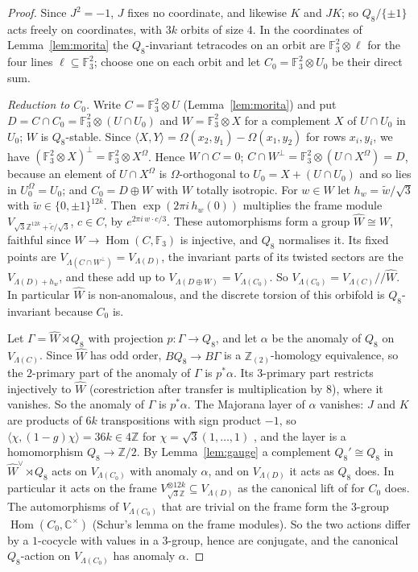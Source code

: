 \documentclass[11pt]{amsart}
\theoremstyle{definition}
\newcommand{\F}{\mathbb{F}_3}
\begin{document}
\begin{proof}
Since $J^2=-1$, $J$ fixes no coordinate, and likewise $K$ and $JK$; so $Q_8/\{\pm1\}$ acts freely
on coordinates, with $3k$ orbits of size $4$. In the coordinates of Lemma~\ref{lem:morita} the
$Q_8$-invariant tetracodes on an orbit are $\F^2\otimes\ell$ for the four lines $\ell\subseteq\F^2$; choose one
on each orbit and let $C_0=\F^2\otimes U_0$ be their direct sum.

\emph{Reduction to $C_0$.} Write $C=\F^2\otimes U$ (Lemma~\ref{lem:morita}) and put
$D=C\cap C_0=\F^2\otimes(U\cap U_0)$ and $W=\F^2\otimes X$ for a complement $X$ of $U\cap U_0$ in $U_0$;
$W$ is $Q_8$-stable. Since $\langle X,Y\rangle=\Omega(x_2,y_1)-\Omega(x_1,y_2)$ for rows $x_i,y_i$, we have
$(\F^2\otimes X)^\perp=\F^2\otimes X^\Omega$. Hence $W\cap C=0$; $C\cap W^\perp=\F^2\otimes(U\cap X^\Omega)=D$,
because an element of $U\cap X^\Omega$ is $\Omega$-orthogonal to $U_0=X+(U\cap U_0)$ and so lies in
$U_0^\Omega=U_0$; and $C_0=D\oplus W$ with $W$ totally isotropic. For $w\in W$ let $h_w=\tilde w/\sqrt3$ with
$\tilde w\in\{0,\pm1\}^{12k}$. Then $\exp(2\pi i\,h_w(0))$ multiplies the frame module
$V_{\sqrt3\mathbb Z^{12k}+\tilde c/\sqrt3}$, $c\in C$, by $e^{2\pi i\,w\cdot c/3}$. These automorphisms form a
group $\hat W\cong W$, faithful since $W\to\operatorname{Hom}(C,\F)$ is injective, and $Q_8$ normalises it.
Its fixed points are $V_{\Lambda(C\cap W^\perp)}=V_{\Lambda(D)}$, the invariant parts of its twisted sectors are
the $V_{\Lambda(D)+h_w}$, and these add up to $V_{\Lambda(D\oplus W)}=V_{\Lambda(C_0)}$. So
$V_{\Lambda(C_0)}=V_{\Lambda(C)}/\!\!/\hat W$. In particular $\hat W$ is non-anomalous, and the discrete torsion
of this orbifold is $Q_8$-invariant because $C_0$ is.

Let $\Gamma=\hat W\rtimes Q_8$ with projection $p\colon\Gamma\to Q_8$, and let $\alpha$ be the anomaly of $Q_8$ on
$V_{\Lambda(C)}$. Since $\hat W$ has
odd order, $BQ_8\to B\Gamma$ is a $\mathbb Z_{(2)}$-homology equivalence, so the $2$-primary part of the anomaly
of $\Gamma$ is $p^*\alpha$. Its $3$-primary part restricts injectively to $\hat W$ (corestriction after transfer
is multiplication by $8$), where it vanishes. So the anomaly of $\Gamma$ is $p^*\alpha$. The Majorana layer of
$\alpha$ vanishes: $J$ and $K$ are products of $6k$ transpositions with sign product $-1$, so
$\langle\chi,(1-g)\chi\rangle=36k\in4\mathbb Z$ for $\chi=\sqrt3(1,\dots,1)$ \cite[Ex.~4.4]{GJF}, and the layer is
a homomorphism $Q_8\to\mathbb Z/2$. By Lemma~\ref{lem:gauge} a complement $Q_8'\cong Q_8$ in
$\hat W^\vee\rtimes Q_8$ acts on $V_{\Lambda(C_0)}$ with anomaly $\alpha$, and on $V_{\Lambda(D)}$ it acts as $Q_8$
does. In particular it acts on the frame $V_{\sqrt3\mathbb Z}^{\otimes 12k}\subseteq V_{\Lambda(D)}$ as the
canonical lift of \cite[Thm.~3.1]{GJF} for $C_0$ does. The automorphisms of $V_{\Lambda(C_0)}$ that are trivial
on the frame form the $3$-group $\operatorname{Hom}(C_0,\mathbb C^\times)$ (Schur's lemma on the frame modules).
So the two actions differ by a $1$-cocycle with values in a $3$-group, hence are conjugate, and the canonical
$Q_8$-action on $V_{\Lambda(C_0)}$ has anomaly $\alpha$.


\end{proof}
\end{document}
